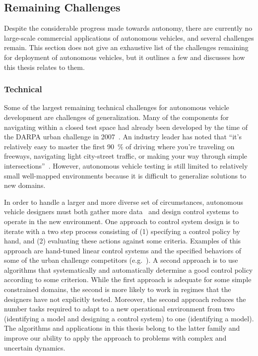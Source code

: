 \subsection{Remaining Challenges}

Despite the considerable progress made towards autonomy, there are currently no large-scale commercial applications of autonomous vehicles, and several challenges remain.
This section does not give an exhaustive list of the challenges remaining for deployment of autonomous vehicles, but it outlines a few and discusses how this thesis relates to them.

\subsubsection{Technical}

Some of the largest remaining technical challenges for autonomous vehicle development are challenges of generalization.
Many of the components for navigating within a closed test space had already been developed by the time of the DARPA urban challenge in 2007~\cite{MB-KI-SS:10}.
An industry leader has noted that ``it's relatively easy to master the first \SI{90}{\percent} of driving where you're traveling on freeways, navigating light city-street traffic, or making your way through simple intersections''~\cite{dolgov2016google}.
However, autonomous vehicle testing is still limited to relatively small well-mapped environments because it is difficult to generalize solutions to new domains.

In order to handle a larger and more diverse set of circumstances, autonomous vehicle designers must both gather more data~\cite{dolgov2016google} and design control systems to operate in the new environment.
One approach to control system design is to iterate with a two step process consisting of (1) specifying a control policy by hand, and (2) evaluating these actions against some criteria.
Examples of this approach are hand-tuned linear control systems and the specified behaviors of some of the urban challenge competitors (e.g.~\citet{urmson2007tartan}).
A second approach is to use algorithms that systematically and automatically determine a good control policy according to some criterion.
While the first approach is adequate for some simple constrained domains, the second is more likely to work in regimes that the designers have not explicitly tested.
Moreover, the second approach reduces the number tasks required to adapt to a new operational environment from two (identifying a model and designing a control system) to one (identifying a model).
The algorithms and applications in this thesis belong to the latter family and improve our ability to apply the approach to problems with complex and uncertain dynamics.


